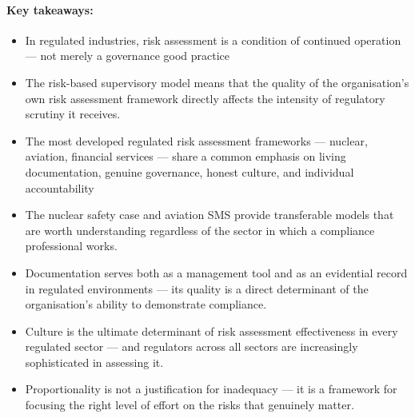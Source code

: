 \paragraph{Key takeaways:}
\begin{itemize}
  \item{In regulated industries, risk assessment is a condition of continued operation — not merely a governance good practice}
  \item{The risk-based supervisory model means that the quality of the organisation's own risk assessment framework directly affects the intensity of regulatory scrutiny it receives.}
  \item{The most developed regulated risk assessment frameworks — nuclear, aviation, financial services — share a common emphasis on living documentation, genuine governance, honest culture, and individual accountability}
  \item{The nuclear safety case and aviation SMS provide transferable models that are worth understanding regardless of the sector in which a compliance professional works.}
  \item{Documentation serves both as a management tool and as an evidential record in regulated environments — its quality is a direct determinant of the organisation's ability to demonstrate compliance.}
  \item{Culture is the ultimate determinant of risk assessment effectiveness in every regulated sector — and regulators across all sectors are increasingly sophisticated in assessing it.}
  \item{Proportionality is not a justification for inadequacy — it is a framework for focusing the right level of effort on the risks that genuinely matter.}
\end{itemize}

